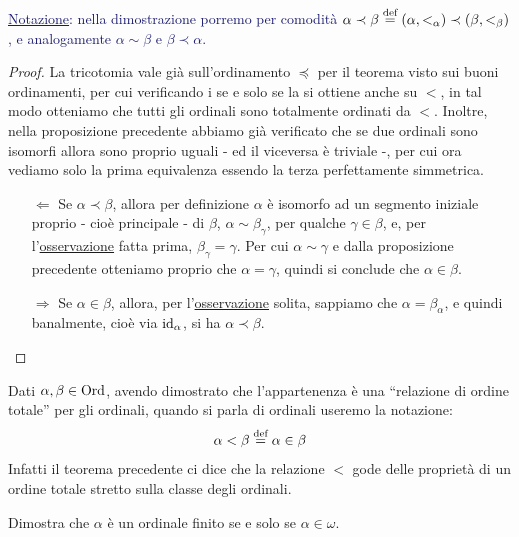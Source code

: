 \textcolor{MidnightBlue}{\underline{Notazione}: nella dimostrazione porremo per comodità $\alpha \prec \beta \overset{\text{def}}{=} (\alpha,<_\alpha) \prec (\beta,<_\beta)$, e analogamente $\alpha \sim \beta$ e $\beta \prec \alpha$.}

\begin{proof}
	La tricotomia vale già sull'ordinamento $\preceq$ per il teorema visto sui buoni ordinamenti, per cui verificando i se e solo se la si ottiene anche su $<$, in tal modo otteniamo che tutti gli ordinali sono totalmente ordinati da $<$. Inoltre,
	nella proposizione precedente abbiamo già verificato che se due ordinali sono isomorfi allora sono proprio uguali - ed il viceversa è triviale -, per cui ora vediamo solo la prima equivalenza essendo la terza perfettamente simmetrica.
	\begin{itemize}
		\item[$\boxed{\Longleftarrow}$] Se $\alpha \prec \beta$, allora per definizione $\alpha$ è isomorfo ad un segmento iniziale proprio - cioè principale -  di $\beta$, $\alpha \sim \beta_\gamma$, per qualche $\gamma \in \beta$, e, per l'\hyperref[Ord_trans]{osservazione} fatta prima, $\beta_\gamma = \gamma$.
		Per cui $\alpha \sim \gamma$ e dalla proposizione precedente otteniamo proprio che $\alpha = \gamma$, quindi si conclude che $\alpha \in \beta$.
		\item[$\boxed{\Longrightarrow}$] Se $\alpha \in \beta$, allora, per l'\hyperref[Ord_trans]{osservazione} solita, sappiamo che $\alpha = \beta_\alpha$, e quindi banalmente, cioè via $\operatorname{id}_\alpha$, si ha $\alpha \prec \beta$.
	\end{itemize}
\end{proof}

\begin{notation}
	Dati $\alpha,\beta \in \operatorname{Ord}$, avendo dimostrato che l'appartenenza è una ``relazione di ordine totale'' per gli ordinali, quando si parla di ordinali useremo la notazione:
	\[ \alpha < \beta \overset{\text{def}}{=} \alpha \in \beta
		\]
	Infatti il teorema precedente ci dice che la relazione $<$ gode delle proprietà di un ordine totale stretto sulla classe degli ordinali.
\end{notation}

\begin{exercise}
	Dimostra che $\alpha$ è un ordinale finito se e solo se $\alpha \in \omega$.
\end{exercise}


